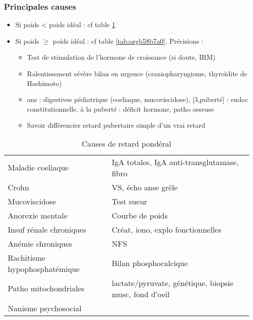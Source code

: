 \documentclass[11pt]{article}
\begin{document}
\subsubsection{Principales causes}
\label{sec:org6ee9e07}
\begin{itemize}
\item Si poids < poids idéal : cf table \ref{tab:orgcd962b1}
\item Si poids \(\ge\) poids idéal : cf table \ref{tab:orgb58b7a0}. Précisions :
\begin{itemize}
\item Test de stimulation de l'hormone de croissance (\danger si doute, IRM)
\item Ralentissement sévère \thus bilan en urgence (craniopharyngiome, thyroïdite de
Hashimoto)
\item\relax [0, 3] ans : digestives pédiatrique (coeliaque, mucoviscidose), [3,puberté] :
endoc constitutionnelle, à la puberté : déficit hormone, patho osseuse
\item Savoir différencier retard pubertaire simple d'un vrai retard
\end{itemize}
\end{itemize}

\begin{table}[htbp]
\caption{\label{tab:orgcd962b1}Causes de retard pondéral}
\centering
\begin{tabular}{ll}
Maladie coeliaque & IgA totales, IgA anti-transglutamase, fibro\\
Crohn & VS, écho anse grêle\\
Mucoviscidose & Test sueur\\
Anorexie mentale & Courbe de poids\\
Insuf rénale chroniques & Créat, iono, explo fonctionnelles\\
Anémie chroniques & NFS\\
Rachitisme hypophosphatémique & Bilan phosphocalcique\\
Patho mitochondriales & lactate/pyruvate, génétique, biopsie musc, fond d'oeil\\
Nanisme psychosocial & \\
\end{tabular}
\end{table}
\end{document}
